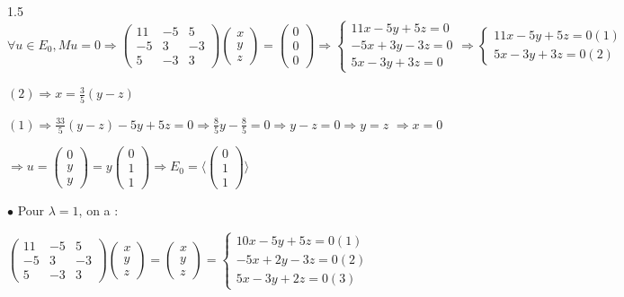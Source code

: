 \documentclass[12pt]{article}
\begin{document}
\begin{spacing}{1.5}
$\forall u\in E_0,Mu=0\Rightarrow \begin{pmatrix}
11 & -5 & 5 \\ 
-5 & 3 & -3 \\ 
5 & -3 & 3
\end{pmatrix}\begin{pmatrix}
x\\
y\\
z
\end{pmatrix}=\begin{pmatrix}
0\\
0\\
0
\end{pmatrix}\Rightarrow \begin{cases}
11x-5y+5z=0\\
-5x+3y-3z=0\\
5x-3y+3z=0
\end{cases}\Rightarrow \begin{cases}
11x-5y+5z=0(1)\\
5x-3y+3z=0(2)
\end{cases}$

$(2)\Longrightarrow x=\frac{3}{5}(y-z)$

$(1)\Longrightarrow \frac{33}{5}(y-z)-5y+5z=0\Longrightarrow  \frac{8}{5}y-\frac{8}{5}=0\Longrightarrow y-z=0\Longrightarrow y=z$ $\Rightarrow x=0$

$\Rightarrow u=\begin{pmatrix}
0\\
y\\
y
\end{pmatrix}=y\begin{pmatrix}
0\\
1  \\
1
\end{pmatrix}\Rightarrow E_0=\langle \begin{pmatrix}
0\\
1\\
1
\end{pmatrix}\rangle$

$\bullet$ Pour $\lambda=1$, on a :

$\begin{pmatrix}
11 & -5 & 5 \\ 
-5 & 3 & -3 \\ 
5 & -3 & 3
\end{pmatrix}\begin{pmatrix}
x\\
y\\
z
\end{pmatrix}=\begin{pmatrix}
x\\
y\\
z
\end{pmatrix}=\begin{cases}
10x-5y+5z=0(1)\\
-5x+2y-3z=0(2)\\
5x-3y+2z=0(3)
\end{cases}$


\end{spacing}
\end{document}
